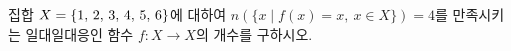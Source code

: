 \hspace*{2mm}\begin{minipage}[t]{\dimexpr\linewidth-2mm\relax}\vspace{0pt}
집합 $X=\{1,\mkern3mu 2,\mkern3mu 3,\mkern3mu 4,\mkern3mu 5,\mkern3mu 6\}$에 대하여 $n(\{x \mid f(x)=x,\ x\in X\})=4$를 만족시키는 일대일대응인 함수 $f:X\longrightarrow X$의 개수를 구하시오.\end{minipage}
